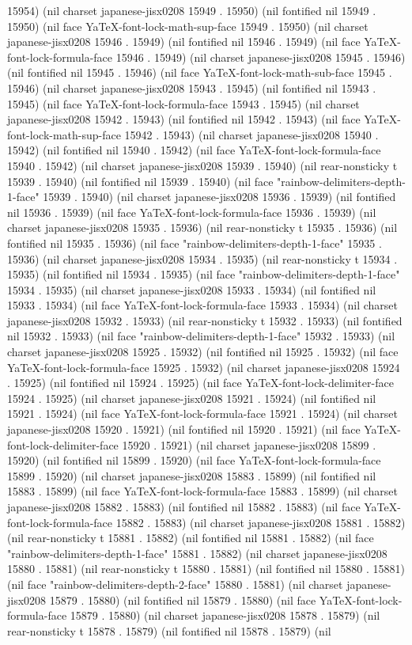 15954) (nil charset japanese-jisx0208 15949 . 15950) (nil fontified nil 15949 . 15950) (nil face YaTeX-font-lock-math-sup-face 15949 . 15950) (nil charset japanese-jisx0208 15946 . 15949) (nil fontified nil 15946 . 15949) (nil face YaTeX-font-lock-formula-face 15946 . 15949) (nil charset japanese-jisx0208 15945 . 15946) (nil fontified nil 15945 . 15946) (nil face YaTeX-font-lock-math-sub-face 15945 . 15946) (nil charset japanese-jisx0208 15943 . 15945) (nil fontified nil 15943 . 15945) (nil face YaTeX-font-lock-formula-face 15943 . 15945) (nil charset japanese-jisx0208 15942 . 15943) (nil fontified nil 15942 . 15943) (nil face YaTeX-font-lock-math-sup-face 15942 . 15943) (nil charset japanese-jisx0208 15940 . 15942) (nil fontified nil 15940 . 15942) (nil face YaTeX-font-lock-formula-face 15940 . 15942) (nil charset japanese-jisx0208 15939 . 15940) (nil rear-nonsticky t 15939 . 15940) (nil fontified nil 15939 . 15940) (nil face "rainbow-delimiters-depth-1-face" 15939 . 15940) (nil charset japanese-jisx0208 15936 . 15939) (nil fontified nil 15936 . 15939) (nil face YaTeX-font-lock-formula-face 15936 . 15939) (nil charset japanese-jisx0208 15935 . 15936) (nil rear-nonsticky t 15935 . 15936) (nil fontified nil 15935 . 15936) (nil face "rainbow-delimiters-depth-1-face" 15935 . 15936) (nil charset japanese-jisx0208 15934 . 15935) (nil rear-nonsticky t 15934 . 15935) (nil fontified nil 15934 . 15935) (nil face "rainbow-delimiters-depth-1-face" 15934 . 15935) (nil charset japanese-jisx0208 15933 . 15934) (nil fontified nil 15933 . 15934) (nil face YaTeX-font-lock-formula-face 15933 . 15934) (nil charset japanese-jisx0208 15932 . 15933) (nil rear-nonsticky t 15932 . 15933) (nil fontified nil 15932 . 15933) (nil face "rainbow-delimiters-depth-1-face" 15932 . 15933) (nil charset japanese-jisx0208 15925 . 15932) (nil fontified nil 15925 . 15932) (nil face YaTeX-font-lock-formula-face 15925 . 15932) (nil charset japanese-jisx0208 15924 . 15925) (nil fontified nil 15924 . 15925) (nil face YaTeX-font-lock-delimiter-face 15924 . 15925) (nil charset japanese-jisx0208 15921 . 15924) (nil fontified nil 15921 . 15924) (nil face YaTeX-font-lock-formula-face 15921 . 15924) (nil charset japanese-jisx0208 15920 . 15921) (nil fontified nil 15920 . 15921) (nil face YaTeX-font-lock-delimiter-face 15920 . 15921) (nil charset japanese-jisx0208 15899 . 15920) (nil fontified nil 15899 . 15920) (nil face YaTeX-font-lock-formula-face 15899 . 15920) (nil charset japanese-jisx0208 15883 . 15899) (nil fontified nil 15883 . 15899) (nil face YaTeX-font-lock-formula-face 15883 . 15899) (nil charset japanese-jisx0208 15882 . 15883) (nil fontified nil 15882 . 15883) (nil face YaTeX-font-lock-formula-face 15882 . 15883) (nil charset japanese-jisx0208 15881 . 15882) (nil rear-nonsticky t 15881 . 15882) (nil fontified nil 15881 . 15882) (nil face "rainbow-delimiters-depth-1-face" 15881 . 15882) (nil charset japanese-jisx0208 15880 . 15881) (nil rear-nonsticky t 15880 . 15881) (nil fontified nil 15880 . 15881) (nil face "rainbow-delimiters-depth-2-face" 15880 . 15881) (nil charset japanese-jisx0208 15879 . 15880) (nil fontified nil 15879 . 15880) (nil face YaTeX-font-lock-formula-face 15879 . 15880) (nil charset japanese-jisx0208 15878 . 15879) (nil rear-nonsticky t 15878 . 15879) (nil fontified nil 15878 . 15879) (nil 